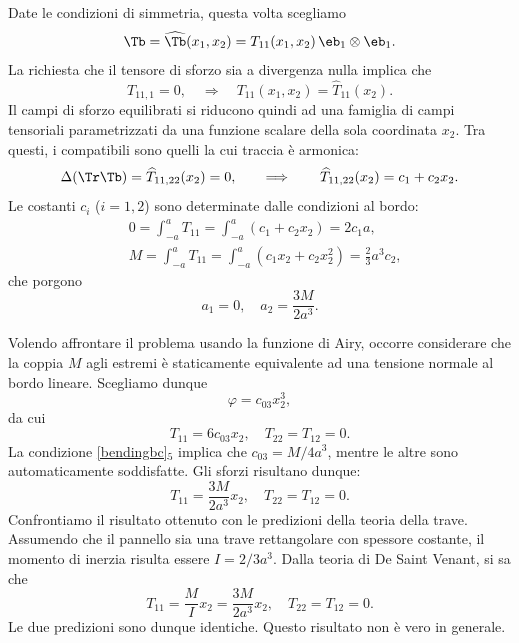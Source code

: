Date le condizioni di simmetria, questa volta scegliamo
\begin{equation}
	\Tb=\widehat{\Tb}(x_1,x_2)=T_{11}(x_1,x_2)\,\eb_1\otimes\eb_1.
\end{equation}
La richiesta che il tensore di sforzo sia a divergenza nulla implica che
\begin{equation}
T_{11,1}=0, \quad \Longrightarrow \quad T_{11}(x_1,x_2)=\widehat{T}_{11}(x_2).
\end{equation}
Il campi di sforzo equilibrati si riducono quindi ad una famiglia di campi tensoriali parametrizzati da una funzione scalare della sola coordinata  $x_2$. Tra questi, i compatibili sono quelli la cui traccia è armonica:
\begin{equation}
	\Delta(\Tr\Tb)=\widehat{T}_{11,22}(x_2)=0, \qquad \Longrightarrow \qquad \widehat{T}_{11,22}(x_2)=c_1+c_2x_2.
\end{equation}
Le costanti $c_i$ ($i=1,2$) sono determinate dalle condizioni al bordo:
\begin{equation}
	\begin{aligned}
		& 0=\int_{-a}^{a}T_{11}=\int_{-a}^{a}(c_1+c_2x_2)=2c_1a,\\
		& M=\int_{-a}^{a}T_{11}=\int_{-a}^{a}(c_1x_2+c_2x_2^2)=\frac{2}{3}a^3c_2,
	\end{aligned}
\end{equation}
che porgono
$$
a_1=0, \quad a_2=\frac{3M}{2a^3}.
$$

Volendo affrontare il problema usando la funzione di Airy, occorre considerare che la coppia $M$ agli estremi è staticamente equivalente ad una tensione normale al bordo lineare. Scegliamo dunque
\begin{equation}
	\varphi=c_{03}x_2^3,
\end{equation}
da cui
\begin{equation}
	T_{11}=6c_{03}x_2, \quad T_{22}=T_{12}=0.
\end{equation}
La condizione \eqref{bendingbc}$_5$ implica che $c_{03}=M/4a^3$, mentre le altre sono automaticamente soddisfatte. Gli sforzi risultano dunque:
\begin{equation}
	T_{11}=\frac{3M}{2a^3}x_2, \quad T_{22}=	T_{12}=0.
\end{equation}
Confrontiamo il risultato ottenuto con le predizioni della teoria della trave. Assumendo che il pannello sia una trave rettangolare con spessore  costante, il momento di inerzia risulta essere $I=2/3a^3$. Dalla teoria di De Saint Venant, si sa che
\begin{equation}
	T_{11}=\frac{M}{I}x_2=\frac{3M}{2a^3}x_2, \quad T_{22}=	T_{12}=0.
\end{equation}
Le due predizioni sono dunque identiche. Questo risultato non è vero in generale.


